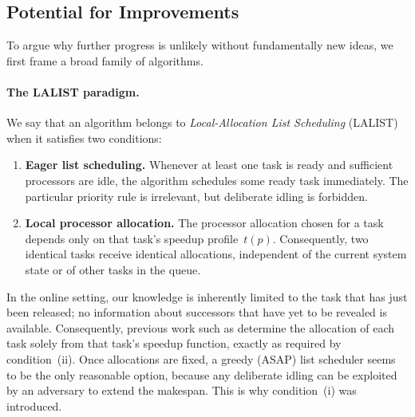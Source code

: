 \documentclass{article}
\begin{document}
\subsection{Potential for Improvements}


To argue why further progress is unlikely without fundamentally new ideas, we first frame a broad family of algorithms.

\paragraph{The \textsc{LALIST} paradigm.}
We say that an algorithm belongs to \emph{Local-Allocation List Scheduling} (\textsc{LALIST}) when it satisfies two conditions:
\begin{enumerate}[label=(\roman*)]
    \item \textbf{Eager list scheduling.}  
          Whenever at least one task is ready and sufficient processors are idle, the algorithm schedules some ready task immediately.  The particular priority rule is irrelevant, but deliberate idling is forbidden.
    \item \textbf{Local processor allocation.}  
          The processor allocation chosen for a task depends only on that task’s speedup profile~$t(p)$.  Consequently, two identical tasks receive identical allocations, independent of the current system state or of other tasks in the queue.
\end{enumerate}

In the online setting, our knowledge is inherently limited to the task that has
just been released; no information about successors that have yet to be revealed is available.
Consequently, previous work such as \cite{ICPP22,TOPC24} determine the
allocation of each task solely from that task’s speedup function, exactly as
required by condition~(ii).
Once allocations are fixed, a greedy (ASAP) list scheduler seems to be the only
reasonable option, because any deliberate idling can be exploited by an
adversary to extend the makespan. This is why condition~(i) was introduced.
\end{document}

